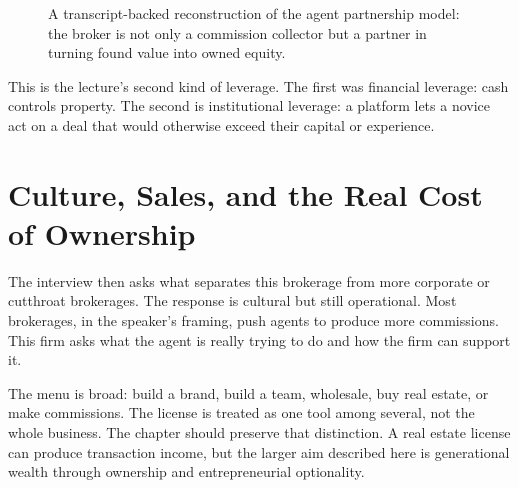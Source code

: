 \begin{figure}
\centering
{}
\caption{A transcript-backed reconstruction of the agent partnership model: the broker is not only a commission collector but a partner in turning found value into owned equity.}
\end{figure}

This is the lecture's second kind of leverage. The first was financial leverage: cash controls property. The second is institutional leverage: a platform lets a novice act on a deal that would otherwise exceed their capital or experience.

\section{Culture, Sales, and the Real Cost of Ownership}

The interview then asks what separates this brokerage from more corporate or cutthroat brokerages. The response is cultural but still operational. Most brokerages, in the speaker's framing, push agents to produce more commissions. This firm asks what the agent is really trying to do and how the firm can support it.

The menu is broad: build a brand, build a team, wholesale, buy real estate, or make commissions. The license is treated as one tool among several, not the whole business. The chapter should preserve that distinction. A real estate license can produce transaction income, but the larger aim described here is generational wealth through ownership and entrepreneurial optionality.

